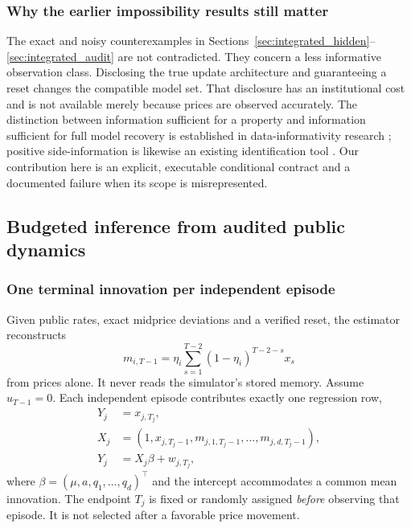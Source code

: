 \documentclass[10pt,twocolumn,letterpaper]{article}
\theoremstyle{definition}
\theoremstyle{remark}
\begin{document}
\subsubsection{Why the earlier impossibility results still matter}
The exact and noisy counterexamples in Sections~\ref{sec:integrated_hidden}--\ref{sec:integrated_audit} are not contradicted. They concern a less informative observation class. Disclosing the true update architecture and guaranteeing a reset changes the compatible model set. That disclosure has an institutional cost and is not available merely because prices are observed accurately. The distinction between information sufficient for a property and information sufficient for full model recovery is established in data-informativity research \citep{vanwaarde2020}; positive side-information is likewise an existing identification tool \citep{khosravi2025}. Our contribution here is an explicit, executable conditional contract and a documented failure when its scope is misrepresented.

\subsection{Budgeted inference from audited public dynamics}
\label{sec:audited_inference}
\label{sec:budgeted_audit}
\subsubsection{One terminal innovation per independent episode}
Given public rates, exact midprice deviations and a verified reset, the estimator reconstructs
\begin{equation}
 m_{i,T-1}=\eta_i\sum_{s=1}^{T-2}(1-\eta_i)^{T-2-s}x_s
 \label{eq:observable_memory}
\end{equation}
from prices alone. It never reads the simulator's stored memory. Assume $u_{T-1}=0$. Each independent episode contributes exactly one regression row,
\begin{align}
 Y_j &= x_{j,T_j}, \nonumber\\
 X_j &= (1,x_{j,T_j-1},m_{j,1,T_j-1},\ldots,m_{j,d,T_j-1}), \nonumber\\
 Y_j &= X_j\beta+w_{j,T_j},
 \label{eq:terminal_regression}
\end{align}
where $\beta=(\mu,a,q_1,\ldots,q_d)^\top$ and the intercept accommodates a common mean innovation. The endpoint $T_j$ is fixed or randomly assigned \emph{before} observing that episode. It is not selected after a favorable price movement.
\end{document}
